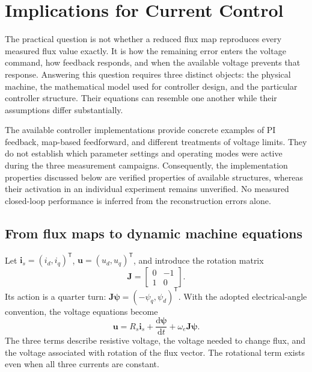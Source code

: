 \chapter{Implications for Current Control}\label{ch:control}

The practical question is not whether a reduced flux map reproduces every measured flux value exactly. It is how the remaining error enters the voltage command, how feedback responds, and when the available voltage prevents that response. Answering this question requires three distinct objects: the physical machine, the mathematical model used for controller design, and the particular controller structure. Their equations can resemble one another while their assumptions differ substantially.

The available controller implementations provide concrete examples of PI feedback, map-based feedforward, and different treatments of voltage limits. They do not establish which parameter settings and operating modes were active during the three measurement campaigns. Consequently, the implementation properties discussed below are verified properties of available structures, whereas their activation in an individual experiment remains unverified. No measured closed-loop performance is inferred from the reconstruction errors alone.

\section{From flux maps to dynamic machine equations}

Let $\bm i_s=(i_d,i_q)^{\mathsf T}$, $\bm u=(u_d,u_q)^{\mathsf T}$, and introduce the rotation matrix
\begin{equation}
 \bm J=\begin{bmatrix}0&-1\\1&0\end{bmatrix}.
\end{equation}
Its action is a quarter turn: $\bm J\bm\psi=(-\psi_q,\psi_d)^{\mathsf T}$. With the adopted electrical-angle convention, the voltage equations become
\begin{equation}
 \bm u=R_s\bm i_s+\frac{\mathrm d\bm\psi}{\mathrm dt}
             +\omega_e\bm J\bm\psi.
 \label{eq:control-voltage-vector}
\end{equation}
The three terms describe resistive voltage, the voltage needed to change flux, and the voltage associated with rotation of the flux vector. The rotational term exists even when all three currents are constant.

